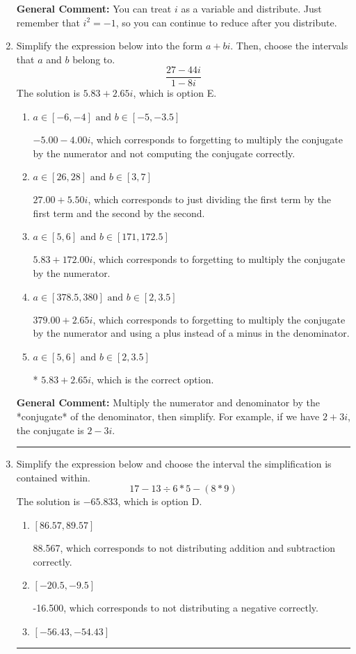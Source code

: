 \documentclass{extbook}[14pt]
\newcommand{\litem}[1]{\item #1

\rule{\textwidth}{0.4pt}}
\begin{document}
\begin{enumerate}
{\textbf{General Comment:} You can treat $i$ as a variable and distribute. Just remember that $i^2=-1$, so you can continue to reduce after you distribute.
}
\litem{
Simplify the expression below into the form $a+bi$. Then, choose the intervals that $a$ and $b$ belong to.
\[ \frac{27 - 44 i}{1 - 8 i} \]The solution is \( 5.83  + 2.65 i \), which is option E.\begin{enumerate}[label=\Alph*.]
\item \( a \in [-6, -4] \text{ and } b \in [-5, -3.5] \)

 $-5.00  - 4.00 i$, which corresponds to forgetting to multiply the conjugate by the numerator and not computing the conjugate correctly.
\item \( a \in [26, 28] \text{ and } b \in [3, 7] \)

 $27.00  + 5.50 i$, which corresponds to just dividing the first term by the first term and the second by the second.
\item \( a \in [5, 6] \text{ and } b \in [171, 172.5] \)

 $5.83  + 172.00 i$, which corresponds to forgetting to multiply the conjugate by the numerator.
\item \( a \in [378.5, 380] \text{ and } b \in [2, 3.5] \)

 $379.00  + 2.65 i$, which corresponds to forgetting to multiply the conjugate by the numerator and using a plus instead of a minus in the denominator.
\item \( a \in [5, 6] \text{ and } b \in [2, 3.5] \)

* $5.83  + 2.65 i$, which is the correct option.
\end{enumerate}

\textbf{General Comment:} Multiply the numerator and denominator by the *conjugate* of the denominator, then simplify. For example, if we have $2+3i$, the conjugate is $2-3i$.
}
\litem{
Simplify the expression below and choose the interval the simplification is contained within.
\[ 17 - 13 \div 6 * 5 - (8 * 9) \]The solution is \( -65.833 \), which is option D.\begin{enumerate}[label=\Alph*.]
\item \( [86.57, 89.57] \)

 88.567, which corresponds to not distributing addition and subtraction correctly.
\item \( [-20.5, -9.5] \)

 -16.500, which corresponds to not distributing a negative correctly.
\item \( [-56.43, -54.43] \)


\end{enumerate}}
\end{enumerate}
\end{document}
